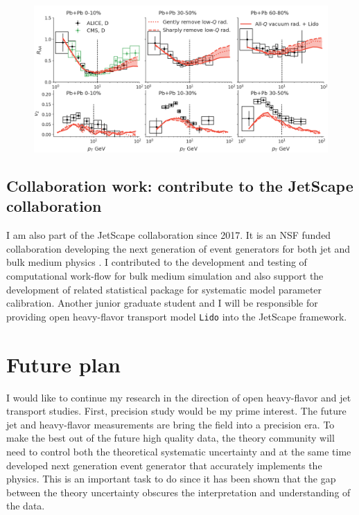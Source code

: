 \documentclass[10pt,a4paper]{article}
\begin{document}
\begin{figure}
\begin{center}
\includegraphics[width=\textwidth]{raa_mclpm.png}
\caption{}
\end{center}
\end{figure}

\subsection{  Collaboration work: contribute to the JetScape collaboration}

I am also part of the JetScape collaboration since 2017. 
It is an NSF funded collaboration developing the next generation of event generators for both jet and bulk medium physics \cite{JetScape}. 
I contributed to the development and testing of computational work-flow for bulk medium simulation and also support the development of related statistical package for systematic model parameter calibration.
Another junior graduate student and I will be responsible for providing open heavy-flavor transport model {\tt Lido} into the JetScape framework.

\section{Future plan}
I would like to continue my research in the direction of open heavy-flavor and jet transport studies.
First, precision study would be my prime interest. 
The future jet and heavy-flavor measurements are bring the field into a precision era. To make the best out of the future high quality data, the theory community will need to control both the theoretical systematic uncertainty and at the same time developed next generation event generator that accurately implements the physics.
This is an important task to do since it has been shown that the gap between the theory uncertainty obscures the interpretation and understanding of the data.
\end{document}
